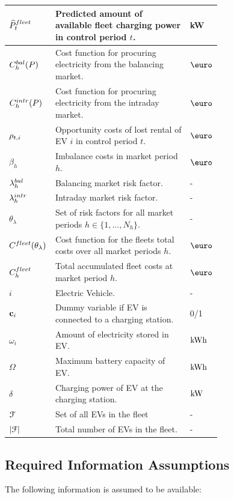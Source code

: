 \documentclass[a4paper, 12pt]{article}
\begin{document}
\begin{longtable}{l|p{0.7\linewidth}|l}
\(\widehat{P}^{fleet}_{t}\) & Predicted amount of available fleet charging power in control period \(t\). & kW\\
\hline
\(C^{bal}_{h}(P)\) & Cost function for procuring electricity from the balancing market. & \(\eur\)\\
\(C^{intr}_{h}(P)\) & Cost function for procuring electricity from the intraday market. & \(\eur\)\\
\(\rho_{t,i}\) & Opportunity costs of lost rental of EV \(i\) in control period \(t\). & \(\eur\)\\
\(\beta_h\) & Imbalance costs in market period \(h\). & \(\eur\)\\
\hline
\(\lambda^{bal}_{h}\) & Balancing market risk factor. & -\\
\(\lambda^{intr}_{h}\) & Intraday market risk factor. & -\\
\(\theta_{\lambda}\) & Set of risk factors for all market periods \(h\!\in\!\{1,...,N_h\}\). & -\\
\(C^{fleet}_{}(\theta_{\lambda})\) & Cost function for the fleets total costs over all market periods \(h\). & \(\eur\)\\
\(C^{fleet}_{h}\) & Total accumulated fleet costs at market period \(h\). & \(\eur\)\\
\hline
\(i\) & Electric Vehicle. & -\\
\({\bf{c}}_{i}\) & Dummy variable if EV is connected to a charging station. & 0/1\\
\(\omega_{i}\) & Amount of electricity stored in EV. & \(\text{kWh}\)\\
\(\Omega\) & Maximum battery capacity of EV. & \(\text{kWh}\)\\
\(\delta\) & Charging power of EV at the charging station. & \(\text{kW}\)\\
\({\cal{F}}\) & Set of all EVs in the fleet & -\\
\(|\cal{F}|\) & Total number of EVs in the fleet. & -\\
\hline
\end{longtable}

\subsection{Required Information Assumptions \label{sec-model-assumptions}}
\label{sec:org0aefb0a}
The following information is assumed to be available:
\end{document}

